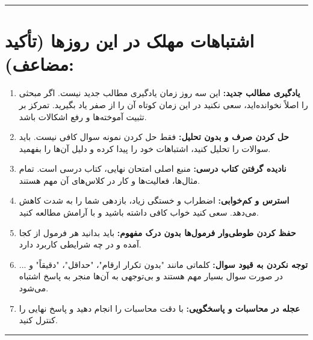 \documentclass[12pt,a4paper]{article}
\begin{document}
\rule{\linewidth}{0.4pt}\vspace{1em}

\section*{اشتباهات مهلک در این روزها (تأکید مضاعف):}
\begin{enumerate}[label=\arabic*., itemsep=0.2em, topsep=0.3em]
    \item \textbf{یادگیری مطالب جدید:} این سه روز زمان یادگیری مطالب جدید نیست. اگر مبحثی را اصلاً نخوانده‌اید، سعی نکنید در این زمان کوتاه آن را از صفر یاد بگیرید. تمرکز بر تثبیت آموخته‌ها و رفع اشکالات باشد.
    \item \textbf{حل کردن صرف و بدون تحلیل:} فقط حل کردن نمونه سوال کافی نیست. باید سوالات را تحلیل کنید، اشتباهات خود را پیدا کرده و دلیل آن‌ها را بفهمید.
    \item \textbf{نادیده گرفتن کتاب درسی:} منبع اصلی امتحان نهایی، کتاب درسی است. تمام مثال‌ها، فعالیت‌ها و کار در کلاس‌های آن مهم هستند.
    \item \textbf{استرس و کم‌خوابی:} اضطراب و خستگی زیاد، بازدهی شما را به شدت کاهش می‌دهد. سعی کنید خواب کافی داشته باشید و با آرامش مطالعه کنید.
    \item \textbf{حفظ کردن طوطی‌وار فرمول‌ها بدون درک مفهوم:} باید بدانید هر فرمول از کجا آمده و در چه شرایطی کاربرد دارد.
    \item \textbf{توجه نکردن به قیود سوال:} کلماتی مانند "بدون تکرار ارقام"، "حداقل"، "دقیقاً" و ... در صورت سوال بسیار مهم هستند و بی‌توجهی به آن‌ها منجر به پاسخ اشتباه می‌شود.
    \item \textbf{عجله در محاسبات و پاسخگویی:} با دقت محاسبات را انجام دهید و پاسخ نهایی را کنترل کنید.
\end{enumerate}

\vspace{1em}
\rule{\linewidth}{0.4pt}\vspace{1em}
\end{document}
